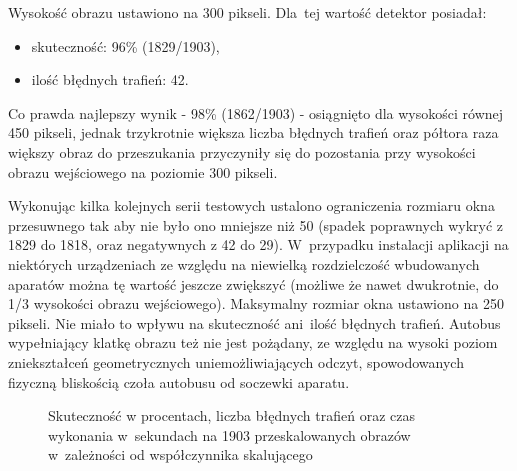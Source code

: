 Wysokość obrazu ustawiono na 300 pikseli. Dla~tej wartość
detektor posiadał:
\begin{itemize}
    \item skuteczność: 96\% (1829/1903),
    \item ilość błędnych trafień: 42.
\end{itemize}

Co prawda najlepszy wynik - 98\% (1862/1903) - osiągnięto dla wysokości
równej 450 pikseli, jednak trzykrotnie większa liczba błędnych
trafień oraz półtora raza większy obraz do przeszukania
przyczyniły się do pozostania przy wysokości obrazu 
wejściowego na poziomie 300 pikseli.

Wykonując kilka kolejnych serii testowych ustalono ograniczenia
rozmiaru okna przesuwnego tak aby nie było ono mniejsze niż 50
(spadek poprawnych wykryć z 1829 do 1818, oraz negatywnych 
z 42 do 29). W~przypadku instalacji aplikacji na niektórych 
urządzeniach
ze względu na niewielką rozdzielczość wbudowanych aparatów
można tę wartość jeszcze zwiększyć (możliwe że nawet dwukrotnie,
do 1/3 wysokości obrazu wejściowego). Maksymalny rozmiar
okna ustawiono na 250 pikseli.
Nie miało to wpływu na skuteczność ani~ilość błędnych
trafień. Autobus wypełniający klatkę obrazu też nie jest 
pożądany, ze względu na wysoki poziom zniekształceń geometrycznych
uniemożliwiających odczyt, spowodowanych fizyczną bliskością
czoła autobusu od soczewki aparatu.

\begin{figure}[h!]
\begin{center}
\end{center}
\caption{Skuteczność w procentach, liczba błędnych trafień
    oraz czas wykonania w~sekundach na 1903 przeskalowanych obrazów
w~zależności od współczynnika skalującego}
\label{chart:img_scale2hitratio}
\end{figure}


